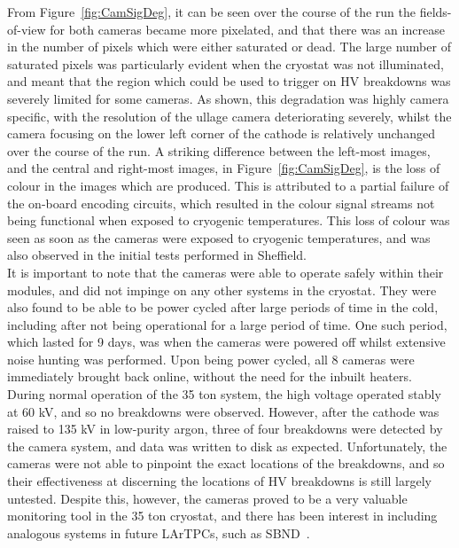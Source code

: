 From Figure~\ref{fig:CamSigDeg}, it can be seen over the course of the run the fields-of-view for both cameras became more pixelated, and that there was an increase in the number of pixels which were either saturated or dead. The large number of saturated pixels was particularly evident when the cryostat was not illuminated, and meant that the region which could be used to trigger on HV breakdowns was severely limited for some cameras. As shown, this degradation was highly camera specific, with the resolution of the ullage camera deteriorating severely, whilst the camera focusing on the lower left corner of the cathode is relatively unchanged over the course of the run. A striking difference between the left-most images, and the central and right-most images, in Figure~\ref{fig:CamSigDeg}, is the loss of colour in the images which are produced. This is attributed to a partial failure of the on-board encoding circuits, which resulted in the colour signal streams not being functional when exposed to cryogenic temperatures. This loss of colour was seen as soon as the cameras were exposed to cryogenic temperatures, and was also observed in the initial tests performed in Sheffield. \\

It is important to note that the cameras were able to operate safely within their modules, and did not impinge on any other systems in the cryostat. They were also found to be able to be power cycled after large periods of time in the cold, including after not being operational for a large period of time. One such period, which lasted for 9 days, was when the cameras were powered off whilst extensive noise hunting was performed. Upon being power cycled, all 8 cameras were immediately brought back online, without the need for the inbuilt heaters. \\

During normal operation of the 35 ton system, the high voltage operated stably at 60 kV, and so no breakdowns were observed. However, after the cathode was raised to 135 kV in low-purity argon, three of four breakdowns were detected by the camera system, and data was written to disk as expected. Unfortunately, the cameras were not able to pinpoint the exact locations of the breakdowns, and so their effectiveness at discerning the locations of HV breakdowns is still largely untested. Despite this, however, the cameras proved to be a very valuable monitoring tool in the 35 ton cryostat, and there has been interest in including analogous systems in future LArTPCs, such as SBND~\citep{SBNProposal}. \\
